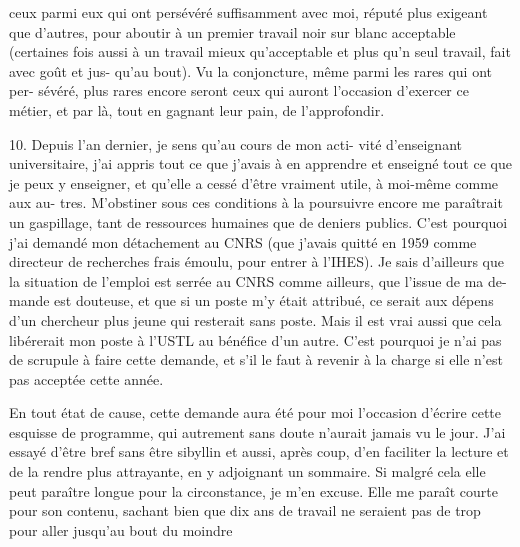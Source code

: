 
ceux parmi eux qui ont persévéré suffisamment avec moi, réputé
plus exigeant que d'autres, pour aboutir à un premier travail
noir sur blanc acceptable (certaines fois aussi à un travail mieux
qu'acceptable et plus qu'n seul travail, fait avec goût et jus-%
qu'au bout). Vu la conjoncture, même parmi les rares qui ont per-%
sévéré, plus rares encore seront ceux qui auront l'occasion
d'exercer ce métier, et par là, tout en gagnant leur pain, de
l'approfondir.

10. Depuis l'an dernier, je sens qu'au cours de mon acti-%
vité d'enseignant universitaire, j'ai appris tout ce que j'avais
à en apprendre et enseigné tout ce que je peux y enseigner, et
qu'elle a cessé d'être vraiment utile, à moi-même comme aux au-%
tres. M'obstiner sous ces conditions à la poursuivre encore me
paraîtrait un gaspillage, tant de ressources humaines que de deniers
publics. C'est pourquoi j'ai demandé mon détachement au CNRS (que
j'avais quitté en 1959 comme directeur de recherches frais émoulu,
pour entrer à l'IHES). Je sais d'ailleurs que la situation de
l'emploi est serrée au CNRS comme ailleurs, que l'issue de ma de-%
mande est douteuse, et que si un poste m'y était attribué, ce serait
aux dépens d'un chercheur plus jeune qui resterait sans poste.
Mais il est vrai aussi que cela libérerait mon poste à l'USTL au
bénéfice d'un autre. C'est pourquoi je n'ai pas de scrupule à
faire cette demande, et s'il le faut à revenir à la charge si elle
n'est pas acceptée cette année.

En tout état de cause, cette demande aura été pour moi
l'occasion d'écrire cette esquisse de programme, qui autrement sans
doute n'aurait jamais vu le jour. J'ai essayé d'être bref sans être
sibyllin et aussi, après coup, d'en faciliter la lecture et de
la rendre plus attrayante, en y adjoignant un sommaire. Si malgré
cela elle peut paraître longue pour la circonstance, je m'en excuse.
Elle me paraît courte pour son contenu, sachant bien que dix ans de
travail ne seraient pas de trop pour aller jusqu'au bout du moindre

